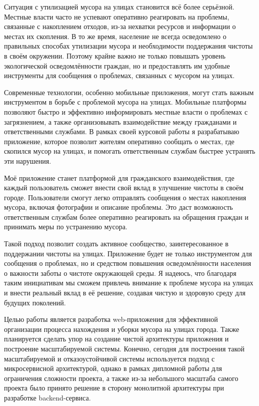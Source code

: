 \documentclass[diploma]{SCWorks}
\begin{document}
Ситуация с утилизацией мусора на улицах становится всё более серьёзной. 
Местные власти часто не успевают оперативно реагировать на проблемы, связанные 
с накоплением отходов, из-за нехватки ресурсов и информации о местах их 
скопления. В то же время, население не всегда осведомлено о правильных 
способах утилизации мусора и необходимости поддержания чистоты в своём 
окружении. Поэтому крайне важно не только повышать уровень экологической 
осведомлённости граждан, но и предоставлять им удобные инструменты для 
сообщения о проблемах, связанных с мусором на улицах.

Современные технологии, особенно мобильные приложения, могут стать важным 
инструментом в борьбе с проблемой мусора на улицах. Мобильные платформы 
позволяют быстро и эффективно информировать местные власти о проблемах с 
загрязнением, а также организовывать взаимодействие между гражданами и 
ответственными службами. В рамках своей курсовой работы я разрабатываю 
приложение, которое позволит жителям оперативно сообщать о местах, где 
скопился мусор на улицах, и помогать ответственным службам быстрее устранять 
эти нарушения.

Моё приложение станет платформой для гражданского взаимодействия, где каждый 
пользователь сможет внести свой вклад в улучшение чистоты в своём городе. 
Пользователи смогут легко отправлять сообщения о местах накопления мусора, 
включая фотографии и описание проблемы. Это даст возможность ответственным 
службам более оперативно реагировать на обращения граждан и принимать меры по 
устранению мусора.

Такой подход позволит создать активное сообщество, заинтересованное в 
поддержании чистоты на улицах. Приложение будет не только инструментом для 
сообщения о проблемах, но и средством повышения осведомлённости населения о 
важности заботы о чистоте окружающей среды. Я надеюсь, что благодаря таким 
инициативам мы сможем привлечь внимание к проблеме мусора на улицах и внести 
реальный вклад в её решение, создавая чистую и здоровую среду для будущих 
поколений.

Целью работы является разработка web-приложения для эффективной организации
процесса нахождения и уборки мусора на улицах города. Также планируется сделать
упор на создание чистой архитектуры приложения и построение 
масштабируемой системы. Конечно, сегодня для построения такой масштабируемой и 
отказоустойчивой системы используется подход с микросервисной архитектурой, 
однако в рамках дипломной работы для ограничения сложности проекта, а также
из-за небольшого масштаба самого проекта было принято решение в сторону
монолитной архитектуры при разработке backend-сервиса.
\end{document}
